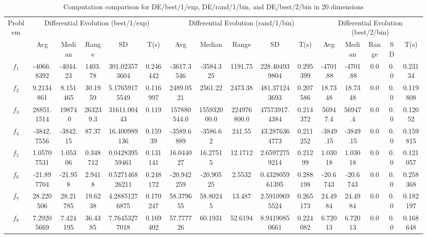 \documentclass[paper=a4, fontsize=11pt]{scrartcl} %
\numberwithin{equation}{section} %
\numberwithin{figure}{section} %
\numberwithin{table}{section} %
\begin{document}
\pagebreak

\begin{landscape}
	\begin{table}
		\tiny
		\centering
		\caption{Computation comparison for DE/best/1/exp, DE/rand/1/bin, and DE/best/2/bin in 20 dimensions}
		\label{Tab1d}
		\begin{tabular}{c|ccccc|ccccc|ccccc}
			\noalign{\smallskip}\hline\noalign{\smallskip}
			Problem & \multicolumn{5}{c}{Differential Evolution (best/1/exp)}& \multicolumn{5}{|c|}{Differential Evolution (rand/1/bin)} &  \multicolumn{5}{c}{Differential Evolution (best/2/bin)} \\  
			\noalign{\smallskip}\hline\noalign{\smallskip}
			& Avg & Median & Range & SD & T(s) & Avg & Median
			& Range & SD & T(s) & Avg & Median & Range & SD &
			T(s) \\ 
			\noalign{\smallskip}\hline\noalign{\smallskip}
			$f_{1}$ & -4066.8392 & -4044.23 & 1403.78 & 301.023573604 & 0.246442 & -3617.3546 & -3584.325 & 1191.75 & 228.404939804 & 0.295399 & -4701.88 & -4701.88 & 0.0 & 0.0 & 0.23134\\
			$f_{2}$ & 9.2134861 & 8.151465 & 30.1959 & 5.17659175549 & 0.116997 & 2489.0521 & 2561.22 & 2473.38 & 481.371243693 & 0.207586 & 18.7348 & 18.7348 & 0.0 & 0.0 & 0.119808\\
			$f_{3}$ & 28851.1514 & 19874.0 & 263239.3 & 31611.00443 & 0.119 & 157880544.0 & 155932000.0 & 224976800.0 & 47573917.4384 & 0.214372 & 56947.4 & 56947.4 & 0.0 & 0.0 & 0.12052\\
			$f_{4}$ & -3842.7556 & -3842.15 & 87.37 & 16.400989136 & 0.15939 & -3589.6889 & -3586.62 & 241.55 & 43.2876364773 & 0.211252 & -3849.15 & -3849.15 & 0.0 & 0.0 & 0.159815\\
			$f_{5}$ & 1.05707531 & 1.05306 & 0.348712 & 0.042839559461 & 0.131141 & 16.044027 & 16.27515 & 12.1712 & 2.65972759214 & 0.21299 & 1.03018 & 1.03018 & 0.0 & 0.0 & 0.121057\\
			$f_{6}$ & -21.897704 & -21.958 & 2.9418 & 0.527146826211 & 0.248172 & -20.942259 & -20.90525 & 2.5532 & 0.432805961395 & 0.288198 & -20.6743 & -20.6743 & 0.0 & 0.0 & 0.258368\\
			$f_{7}$ & 28.220506 & 28.21785 & 19.6238 & 4.28851276875 & 0.170247 & 58.379655 & 58.80245 & 13.487 & 2.59109695524 & 0.265173 & 24.4984 & 24.4984 & 0.0 & 0.0 & 0.182197\\
			$f_{8}$ & 7.29205669 & 7.424195 & 36.4385 & 7.76453277018 & 0.169402 & 57.777726 & 60.1931 & 52.6194 & 8.94190850661 & 0.224082 & 6.72013 & 6.72013 & 0.0 & 0.0 & 0.168648\\

\end{tabular}
\end{table}
\end{landscape}
\end{document}
